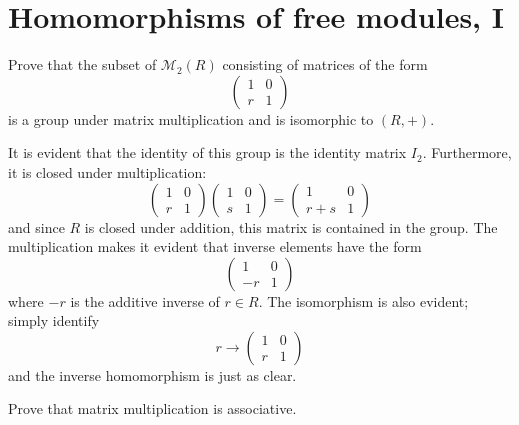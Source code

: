 \documentclass[../../master.tex]{subfiles}
\begin{document}
\section{Homomorphisms of free modules, I}

\begin{problem}
    Prove that the subset of $\mathcal{M}_2(R)$ consisting of matrices of the form
    \[
    \begin{pmatrix}
        1 & 0 \\
        r & 1
    \end{pmatrix}
    \]
    is a group under matrix multiplication and is isomorphic to $(R, +)$.
\end{problem}

\begin{solution}
    It is evident that the identity of this group is the identity matrix $I_2$.
    Furthermore, it is closed under multiplication:
    \[
    \begin{pmatrix}
        1 & 0 \\
        r & 1
    \end{pmatrix}
    \begin{pmatrix}
        1 & 0 \\
        s & 1
    \end{pmatrix} =
    \begin{pmatrix}
        1 & 0 \\
        r + s & 1
    \end{pmatrix}
    \]
    and since $R$ is closed under addition, this matrix is contained in the group.
    The multiplication makes it evident that inverse elements have the form
    \[
    \begin{pmatrix}
        1 & 0 \\
        -r & 1
    \end{pmatrix}
    \]
    where $-r$ is the additive inverse of $r \in R$.
    The isomorphism is also evident; simply identify
    \[
    r \to
    \begin{pmatrix}
        1 & 0 \\
        r & 1
    \end{pmatrix}
    \]
    and the inverse homomorphism is just as clear.
\end{solution}

\begin{problem}
    Prove that matrix multiplication is associative.
\end{problem}
\end{document}
